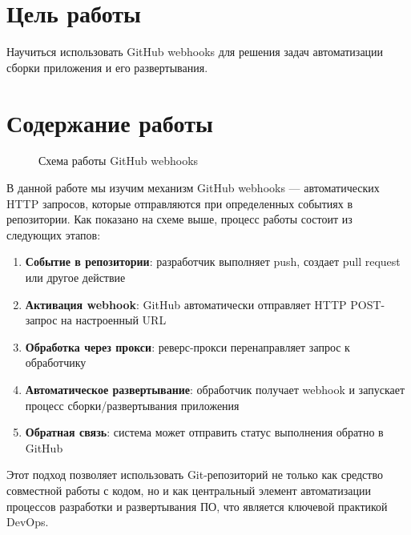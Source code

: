 \documentclass[12pt,a4paper]{article}
\begin{document}
\makelabcover

\commoninstructions

\section{Цель работы}

Научиться использовать GitHub webhooks для решения задач автоматизации сборки приложения и его развертывания.

\section{Содержание работы}
%
%
%
%
\begin{figure}[H]
\centering

\caption{Схема работы GitHub webhooks}
\label{fig:webhooks-schema}
\end{figure}

В данной работе мы изучим механизм GitHub webhooks — автоматических HTTP запросов, которые отправляются при определенных событиях в репозитории.
Как показано на схеме выше, процесс работы состоит из следующих этапов:
\begin{enumerate}
    \item \textbf{Событие в репозитории}: разработчик выполняет push, создает pull request или другое действие
    \item \textbf{Активация webhook}: GitHub автоматически отправляет HTTP POST-запрос на настроенный URL
    \item \textbf{Обработка через прокси}: реверс-прокси перенаправляет запрос к обработчику
    \item \textbf{Автоматическое развертывание}: обработчик получает webhook и запускает процесс сборки/развертывания приложения
    \item \textbf{Обратная связь}: система может отправить статус выполнения обратно в GitHub
\end{enumerate}

Этот подход позволяет использовать Git-репозиторий не только как средство совместной работы с кодом, но и как центральный
элемент автоматизации процессов разработки и развертывания ПО, что является ключевой практикой DevOps.
\end{document}
